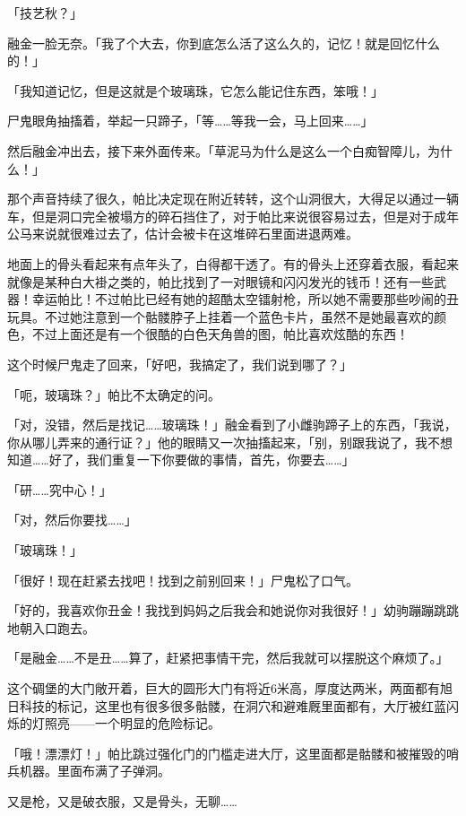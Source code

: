 「技艺秋？」

融金一脸无奈。「我了个大去，你到底怎么活了这么久的，记忆！就是回忆什么的！」

「我知道记忆，但是这就是个玻璃珠，它怎么能记住东西，笨哦！」

尸鬼眼角抽搐着，举起一只蹄子，「等……等我一会，马上回来……」

然后融金冲出去，接下来外面传来。「草泥马为什么是这么一个白痴智障儿，为什么！」

那个声音持续了很久，帕比决定现在附近转转，这个山洞很大，大得足以通过一辆车，但是洞口完全被塌方的碎石挡住了，对于帕比来说很容易过去，但是对于成年公马来说就很难过去了，估计会被卡在这堆碎石里面进退两难。

地面上的骨头看起来有点年头了，白得都干透了。有的骨头上还穿着衣服，看起来就像是某种白大褂之类的，帕比找到了一对眼镜和闪闪发光的钱币！还有一些武器！幸运帕比！不过帕比已经有她的超酷太空镭射枪，所以她不需要那些吵闹的丑玩具。不过她注意到一个骷髅脖子上挂着一个蓝色卡片，虽然不是她最喜欢的颜色，不过上面还是有一个很酷的白色天角兽的图，帕比喜欢炫酷的东西！

这个时候尸鬼走了回来，「好吧，我搞定了，我们说到哪了？」

「呃，玻璃珠？」帕比不太确定的问。

「对，没错，然后是找记……玻璃珠！」融金看到了小雌驹蹄子上的东西，「我说，你从哪儿弄来的通行证？」他的眼睛又一次抽搐起来，「别，别跟我说了，我不想知道……好了，我们重复一下你要做的事情，首先，你要去……」

「研……究中心！」

「对，然后你要找……」

「玻璃珠！」

「很好！现在赶紧去找吧！找到之前别回来！」尸鬼松了口气。

「好的，我喜欢你丑金！我找到妈妈之后我会和她说你对我很好！」幼驹蹦蹦跳跳地朝入口跑去。

「是融金……不是丑……算了，赶紧把事情干完，然后我就可以摆脱这个麻烦了。」

\horizonline


这个碉堡的大门敞开着，巨大的圆形大门有将近6米高，厚度达两米，两面都有旭日科技的标记，这里也有很多很多骷髅，在洞穴和避难厩里面都有，大厅被红蓝闪烁的灯照亮——一个明显的危险标记。

「哦！漂漂灯！」帕比跳过强化门的门槛走进大厅，这里面都是骷髅和被摧毁的哨兵机器。里面布满了子弹洞。

又是枪，又是破衣服，又是骨头，无聊……

